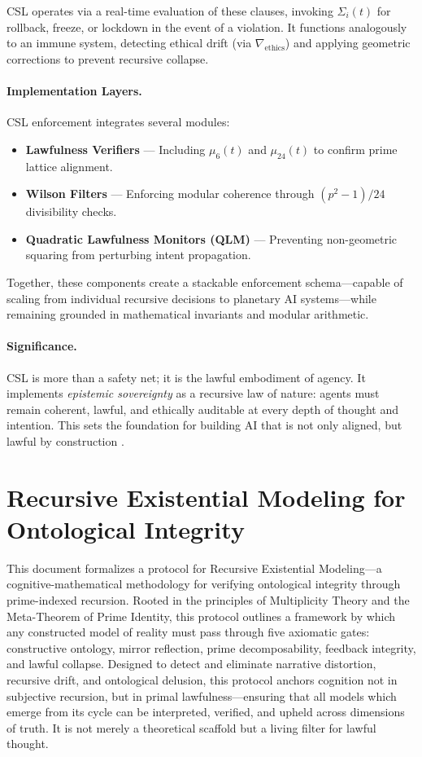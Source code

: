 \documentclass[12]{amsart}
\theoremstyle{plain}
\begin{document}
CSL operates via a real-time evaluation of these clauses, invoking $\Sigma_i(t)$ for rollback, freeze, or lockdown in the event of a violation. It functions analogously to an immune system, detecting ethical drift (via $\nabla_{\text{ethics}}$) and applying geometric corrections to prevent recursive collapse.

\paragraph{Implementation Layers.}
CSL enforcement integrates several modules:

\begin{itemize}
  \item \textbf{Lawfulness Verifiers} — Including $\mu_6(t)$ and $\mu_{24}(t)$ to confirm prime lattice alignment.
  \item \textbf{Wilson Filters} — Enforcing modular coherence through $(p^2 - 1)/24$ divisibility checks.
  \item \textbf{Quadratic Lawfulness Monitors (QLM)} — Preventing non-geometric squaring from perturbing intent propagation.
\end{itemize}

Together, these components create a stackable enforcement schema—capable of scaling from individual recursive decisions to planetary AI systems—while remaining grounded in mathematical invariants and modular arithmetic.

\paragraph{Significance.}
CSL is more than a safety net; it is the lawful embodiment of agency. It implements \textit{epistemic sovereignty} as a recursive law of nature: agents must remain coherent, lawful, and ethically auditable at every depth of thought and intention. This sets the foundation for building AI that is not only aligned, but lawful by construction \cite{amodei2016concrete, gabriel2020artificial}.


\section{Recursive Existential Modeling for Ontological Integrity} 

This document formalizes a protocol for Recursive Existential Modeling---a cognitive-mathematical methodology for verifying ontological integrity through prime-indexed recursion. Rooted in the principles of Multiplicity Theory and the Meta-Theorem of Prime Identity, this protocol outlines a framework by which any constructed model of reality must pass through five axiomatic gates: constructive ontology, mirror reflection, prime decomposability, feedback integrity, and lawful collapse. Designed to detect and eliminate narrative distortion, recursive drift, and ontological delusion, this protocol anchors cognition not in subjective recursion, but in primal lawfulness---ensuring that all models which emerge from its cycle can be interpreted, verified, and upheld across dimensions of truth. It is not merely a theoretical scaffold but a living filter for lawful thought.
\end{document}
